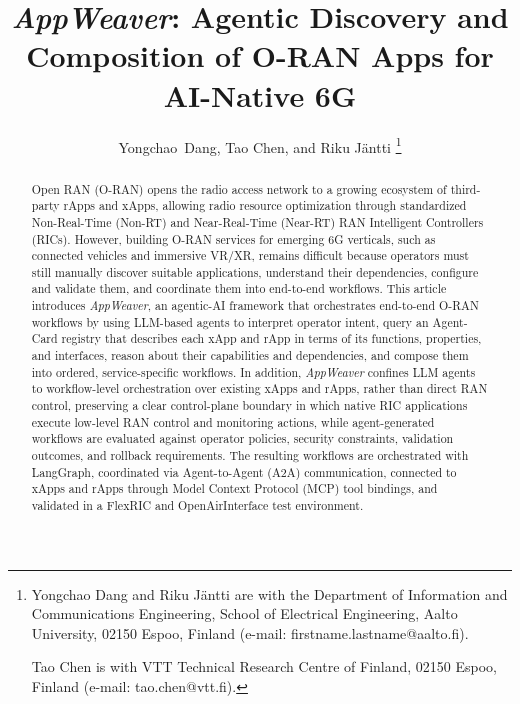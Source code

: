 \documentclass[conference]{IEEEtran}
\begin{document}
\title{\emph{AppWeaver}: Agentic Discovery and Composition of O-RAN Apps for AI-Native 6G}

\author{Yongchao~Dang,
        Tao Chen, 
        and  Riku Jäntti
\thanks{
Yongchao Dang and Riku Jäntti are with the Department of Information and Communications Engineering, School of Electrical Engineering, Aalto University, 02150 Espoo, Finland (e-mail: firstname.lastname@aalto.fi).

Tao Chen is with VTT Technical Research Centre of Finland, 02150 Espoo, Finland (e-mail: tao.chen@vtt.fi).
}
}

\maketitle



\begin{abstract}
Open RAN (O-RAN) opens the radio access network to a growing ecosystem of third-party rApps and xApps, allowing radio resource optimization through standardized Non-Real-Time (Non-RT) and Near-Real-Time (Near-RT) RAN Intelligent Controllers (RICs). However, building O-RAN services for emerging 6G verticals, such as connected vehicles and immersive VR/XR, remains difficult because operators must still manually discover suitable applications, understand their dependencies, configure and validate them, and coordinate them into end-to-end workflows. This article introduces \emph{AppWeaver}, an agentic-AI framework that orchestrates end-to-end O-RAN workflows by using LLM-based agents to interpret operator intent, query an Agent-Card registry that describes each xApp and rApp in terms of its functions, properties, and interfaces, reason about their capabilities and dependencies, and compose them into ordered, service-specific workflows. In addition, \emph{AppWeaver} confines LLM agents to workflow-level orchestration over existing xApps and rApps, rather than direct RAN control, preserving a clear control-plane boundary in which native RIC applications execute low-level RAN control and monitoring actions, while agent-generated workflows are evaluated against operator policies, security constraints, validation outcomes, and rollback requirements. The resulting workflows are orchestrated with LangGraph, coordinated via Agent-to-Agent (A2A) communication, connected to xApps and rApps through Model Context Protocol (MCP) tool bindings, and validated in a FlexRIC and OpenAirInterface test environment.
\end{abstract}
\end{document}
